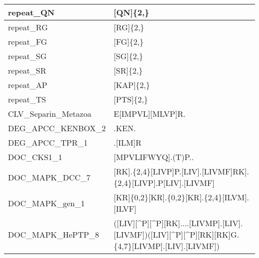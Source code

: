 \begin{landscape}
\begin{longtable}{|l|l|}
\hline
repeat\_QN             & {[}QN]\{2,\}                                                                                                               \\
\hline
repeat\_RG             & {[}RG]\{2,\}                                                                                                               \\
\hline
repeat\_FG             & {[}FG]\{2,\}                                                                                                               \\
\hline
repeat\_SG             & {[}SG]\{2,\}                                                                                                               \\
\hline
repeat\_SR             & {[}SR]\{2,\}                                                                                                               \\
\hline
repeat\_AP             & {[}KAP]\{2,\}                                                                                                              \\
\hline
repeat\_TS             & {[}PTS]\{2,\}                                                                                                              \\
\hline
CLV\_Separin\_Metazoa  & E[IMPVL][MLVP]R.                                                                                                           \\
\hline
DEG\_APCC\_KENBOX\_2   & .KEN.                                                                                                                      \\
\hline
DEG\_APCC\_TPR\_1      & .[ILM]R                                                                                                                    \\
\hline
DOC\_CKS1\_1           & {[}MPVLIFWYQ].(T)P..                                                                                                       \\
\hline
DOC\_MAPK\_DCC\_7      & {[}RK].\{2,4\}{[}LIVP]P.[LIV].[LIVMF]\textbar{}{[}RK].\{2,4\}{[}LIVP].P[LIV].[LIVMF]                                       \\
\hline
DOC\_MAPK\_gen\_1      & {[}KR]\{0,2\}{[}KR].\{0,2\}{[}KR].\{2,4\}{[}ILVM].[ILVF]                                                                   \\
\hline
DOC\_MAPK\_HePTP\_8    & ([LIV][\^{}P][\^{}P][RK]....[LIVMP].[LIV].[LIVMF])\textbar{}([LIV][\^{}P][\^{}P][RK][RK]G.\{4,7\}{[}LIVMP].[LIV].[LIVMF])  \\

\end{longtable}
\end{landscape}
